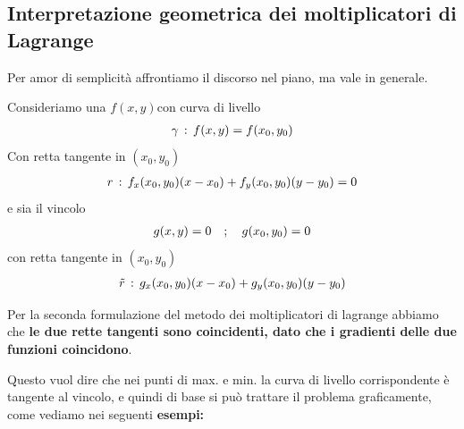 \newpage

\subsection{Interpretazione geometrica dei moltiplicatori di Lagrange}

Per amor di semplicità affrontiamo il discorso nel piano, ma vale in generale.

Consideriamo una $f(x,y)$con curva di livello
\begin{align}
	\gamma \, : \, f(x,y)=f(x_0,y_0)
\end{align}
Con retta tangente in $(x_0,y_0)$
\begin{align}
	r \, : \, f_x(x_0,y_0) (x-x_0) + f_y(x_0,y_0)(y-y_0)=0
\end{align}
e sia il vincolo
\begin{align}
	g(x,y)=0 \quad ; \quad g(x_0,y_0) =0
\end{align}
con retta tangente in $(x_0,y_0)$
\begin{align}
	\tilde{r} \, : \, g_x(x_0,y_0)(x-x_0) + g_y(x_0,y_0)(y-y_0)
\end{align}

Per la seconda formulazione del metodo dei moltiplicatori di lagrange abbiamo che \textbf{le due rette tangenti sono coincidenti, dato che i gradienti delle due funzioni coincidono}.

Questo vuol dire che nei punti di max. e min. la curva di livello corrispondente è tangente al vincolo, e quindi di base si può trattare il problema graficamente, come vediamo nei seguenti \textbf{esempi:}

